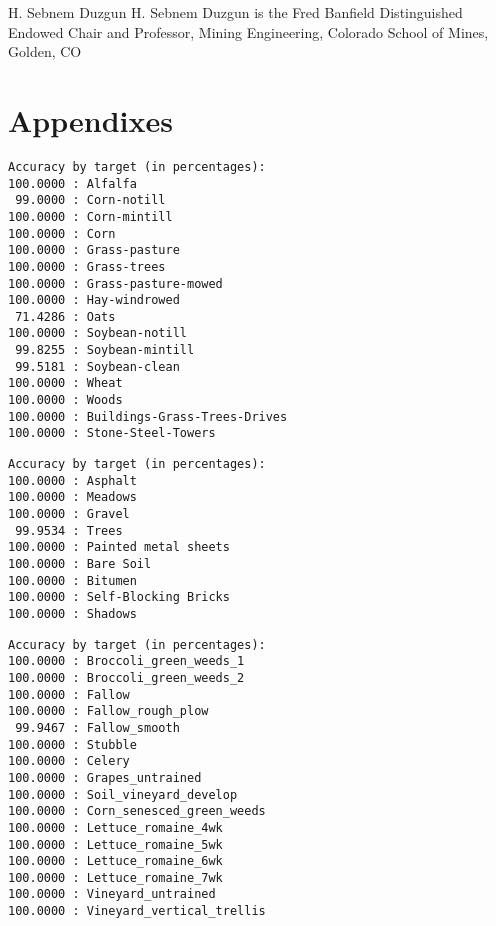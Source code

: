 \documentclass[lettersize, journal]{IEEEtran}
\begin{document}
\vspace{11pt}

\begin{IEEEbiographynophoto}{H. Sebnem Duzgun}
H. Sebnem Duzgun is the Fred Banfield Distinguished Endowed Chair and Professor, Mining Engineering, Colorado School of Mines,
Golden, CO
\end{IEEEbiographynophoto}




\vfill
\newpage
\section{Appendixes}
{
\begin{verbatim}
Accuracy by target (in percentages):
100.0000 : Alfalfa
 99.0000 : Corn-notill
100.0000 : Corn-mintill
100.0000 : Corn
100.0000 : Grass-pasture
100.0000 : Grass-trees
100.0000 : Grass-pasture-mowed
100.0000 : Hay-windrowed
 71.4286 : Oats
100.0000 : Soybean-notill
 99.8255 : Soybean-mintill
 99.5181 : Soybean-clean
100.0000 : Wheat
100.0000 : Woods
100.0000 : Buildings-Grass-Trees-Drives
100.0000 : Stone-Steel-Towers
\end{verbatim}
}
{
\begin{verbatim}
Accuracy by target (in percentages):
100.0000 : Asphalt
100.0000 : Meadows
100.0000 : Gravel
 99.9534 : Trees
100.0000 : Painted metal sheets
100.0000 : Bare Soil
100.0000 : Bitumen
100.0000 : Self-Blocking Bricks
100.0000 : Shadows
\end{verbatim}

}
{
\begin{verbatim}
Accuracy by target (in percentages):
100.0000 : Broccoli_green_weeds_1
100.0000 : Broccoli_green_weeds_2
100.0000 : Fallow
100.0000 : Fallow_rough_plow
 99.9467 : Fallow_smooth
100.0000 : Stubble
100.0000 : Celery
100.0000 : Grapes_untrained
100.0000 : Soil_vineyard_develop
100.0000 : Corn_senesced_green_weeds
100.0000 : Lettuce_romaine_4wk
100.0000 : Lettuce_romaine_5wk
100.0000 : Lettuce_romaine_6wk
100.0000 : Lettuce_romaine_7wk
100.0000 : Vineyard_untrained
100.0000 : Vineyard_vertical_trellis
\end{verbatim}
}
\end{document}
